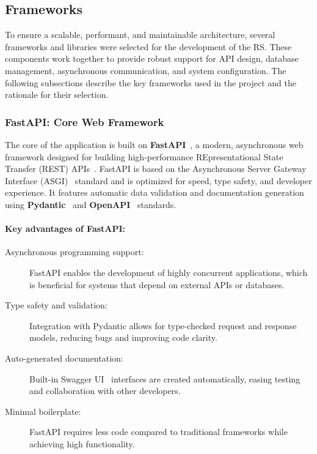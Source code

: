 \subsection{Frameworks}

To ensure a scalable, performant, and maintainable architecture, several frameworks and libraries were selected for the development of the RS. These components work together to provide robust support for API design, database management, asynchronous communication, and system configuration. The following subsections describe the key frameworks used in the project and the rationale for their selection.

\subsubsection{FastAPI: Core Web Framework}

The core of the application is built on \textbf{FastAPI}~\cite{fastAPI}, a modern, asynchronous web framework designed for building high-performance REpresentational State Transfer (REST) APIs~\cite{REST}. FastAPI is based on the Asynchronous Server Gateway Interface (ASGI)~\cite{ASGI} standard and is optimized for speed, type safety, and developer experience. It features automatic data validation and documentation generation using \textbf{Pydantic}~\cite{Pydantic} and \textbf{OpenAPI}~\cite{OpenAPI} standards.

\paragraph{Key advantages of FastAPI:} 

\begin{description}
  \item[Asynchronous programming support:] FastAPI enables the development of highly concurrent applications, which is beneficial for systems that depend on external APIs or databases.
  \item[Type safety and validation:] Integration with Pydantic allows for type-checked request and response models, reducing bugs and improving code clarity.
  \item[Auto-generated documentation:] Built-in Swagger UI~\cite{SwaggerUI} interfaces are created automatically, easing testing and collaboration with other developers.
  \item[Minimal boilerplate:] FastAPI requires less code compared to traditional frameworks while achieving high functionality.
\end{description}

